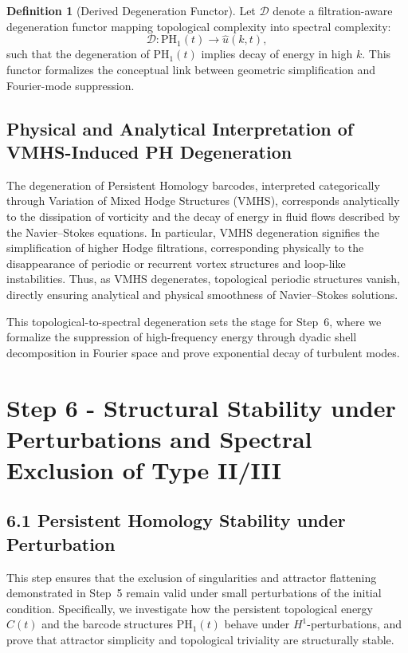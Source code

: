 \documentclass[11pt]{article}
\theoremstyle{definition}
\newtheorem{definition}[theorem]{Definition}
\begin{document}
\begin{definition}[Derived Degeneration Functor]
Let $\mathcal{D}$ denote a filtration-aware degeneration functor mapping topological complexity into spectral complexity:
\[
\mathcal{D} : \mathrm{PH}_1(t) \longrightarrow \widehat{u}(k, t),
\]
such that the degeneration of $\mathrm{PH}_1(t)$ implies decay of energy in high $k$. This functor formalizes the conceptual link between geometric simplification and Fourier-mode suppression.
\end{definition}

\subsection{Physical and Analytical Interpretation of VMHS-Induced PH Degeneration}

The degeneration of Persistent Homology barcodes, interpreted categorically through Variation of Mixed Hodge Structures (VMHS), corresponds analytically to the dissipation of vorticity and the decay of energy in fluid flows described by the Navier–Stokes equations. In particular, VMHS degeneration signifies the simplification of higher Hodge filtrations, corresponding physically to the disappearance of periodic or recurrent vortex structures and loop-like instabilities. Thus, as VMHS degenerates, topological periodic structures vanish, directly ensuring analytical and physical smoothness of Navier–Stokes solutions.

This topological-to-spectral degeneration sets the stage for Step~6, where we formalize the suppression of high-frequency energy through dyadic shell decomposition in Fourier space and prove exponential decay of turbulent modes.



\section{Step 6 - Structural Stability under Perturbations and Spectral Exclusion of Type II/III}
\label{sec:step6}

\subsection{6.1 Persistent Homology Stability under Perturbation}

This step ensures that the exclusion of singularities and attractor flattening demonstrated in Step~5 remain valid under small perturbations of the initial condition. Specifically, we investigate how the persistent topological energy $C(t)$ and the barcode structures $\mathrm{PH}_1(t)$ behave under $H^1$-perturbations, and prove that attractor simplicity and topological triviality are structurally stable.
\end{document}
